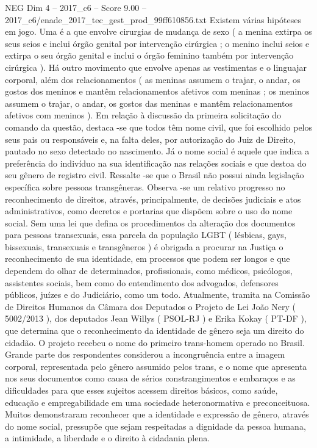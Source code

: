 \begin{textsample}{NEG Dim 4 – 2017\_c6 – Score 9.00 – 2017\_c6/enade\_2017\_tec\_gest\_prod\_99ff610856.txt}
Existem várias hipóteses em jogo.
Uma é a que envolve cirurgias de mudança de sexo ( a menina extirpa os seus seios e inclui órgão genital por intervenção cirúrgica ; o menino inclui seios e extirpa o seu órgão genital e inclui o órgão feminino também por intervenção cirúrgica ).
Há outro movimento que envolve apenas as vestimentas e o linguajar corporal, além dos relacionamentos ( as meninas assumem o trajar, o andar, os gostos dos meninos e mantêm relacionamentos afetivos com meninas ; os meninos assumem o trajar, o andar, os gostos das meninas e mantêm relacionamentos afetivos com meninos ).
Em relação à discussão da primeira solicitação do comando da questão, destaca -se que todos têm nome civil, que foi escolhido pelos seus pais ou responsáveis e, na falta deles, por autorização do Juiz de Direito, pautado no sexo detectado no nascimento.
Já o nome social é aquele que indica a preferência do indivíduo na sua identificação nas relações sociais e que destoa do seu gênero de registro civil.
Ressalte -se que o Brasil não possui ainda legislação específica sobre pessoas transgêneras.
Observa -se um relativo progresso no reconhecimento de direitos, através, principalmente, de decisões judiciais e atos administrativos, como decretos e portarias que dispõem sobre o uso do nome social.
Sem uma lei que defina os procedimentos da alteração dos documentos para pessoas transexuais, essa parcela da população LGBT ( lésbicas, gays, bissexuais, transexuais e transgêneros ) é obrigada a procurar na Justiça o reconhecimento de sua identidade, em processos que podem ser longos e que dependem do olhar de determinados, profissionais, como médicos, psicólogos, assistentes sociais, bem como do entendimento dos advogados, defensores públicos, juízes e do Judiciário, como um todo.
Atualmente, tramita na Comissão de Direitos Humanos da Câmara dos Deputados o Projeto de Lei João Nery ( 5002/2013 ), dos deputados Jean Willys ( PSOL-RJ ) e Erika Kokay ( PT-DF ), que determina que o reconhecimento da identidade de gênero seja um direito do cidadão.
O projeto recebeu o nome do primeiro trans-homem operado no Brasil.
Grande parte dos respondentes considerou a incongruência entre a imagem corporal, representada pelo gênero assumido pelos trans, e o nome que apresenta nos seus documentos como causa de sérios constrangimentos e embaraços e as dificuldades para que esses sujeitos acessem direitos básicos, como saúde, educação e empregabilidade em uma sociedade heteronormativa e preconceituosa.
Muitos demonstraram reconhecer que a identidade e expressão de gênero, através do nome social, pressupõe que sejam respeitadas a dignidade da pessoa humana, a intimidade, a liberdade e o direito à cidadania plena.

\end{textsample}
